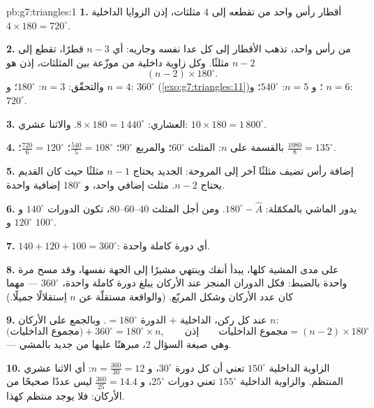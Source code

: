 \begin{solution}{pb:g7:triangles:1}
\textbf{1.} أقطار رأس واحد من  تقطعه
إلى $4$ مثلثات، إذن  الزوايا الداخلية
$4 \times 180 = 720^\circ$.

\textbf{2.} من رأس واحد، تذهب الأقطار إلى كل  عدا
نفسه وجاريه: أي $n - 3$ قطرًا، تقطع
 إلى $n - 2$ مثلثًا. وكل زاوية داخلية من
 موزّعة بين المثلثات، إذن  هو
\[
(n - 2) \times 180^\circ .
\]
والتحقّق: $n = 3$: $180^\circ$؛ و $n = 4$: $360^\circ$
(\cref{exo:g7:triangles:11})؛ و $n = 5$: $540^\circ$؛ و $n = 6$:
$720^\circ$.

\textbf{3.} العشاري: $8 \times 180 = 1\,440^\circ$. والاثنا عشري:
$10 \times 180 = 1\,800^\circ$.

\textbf{4.} بالقسمة على $n$: المثلث $60^\circ$؛ والمربع
$90^\circ$؛  $\frac{540}{5} = 108^\circ$؛ 
$\frac{720}{6} = 120^\circ$؛  $\frac{1080}{8} =
135^\circ$.

\textbf{5.} إضافة رأس تضيف مثلثًا آخر إلى المروحة:
 الجديد يحتاج $n - 1$ مثلثًا حيث كان القديم يحتاج
$n - 2$. مثلث إضافي واحد، و $180^\circ$ إضافية واحدة.

\textbf{6.} يدور الماشي بالمكمّلة:
$180^\circ - \widehat A$. ومن أجل المثلث $40$--$60$--$80$، تكون
الدورات $140^\circ$ و $120^\circ$ و $100^\circ$.

\textbf{7.} $140 + 120 + 100 = 360^\circ$: أي دورة كاملة واحدة.

\textbf{8.} على مدى المشية كلها، يبدأ أنفك وينتهي
مشيرًا إلى الجهة نفسها، وقد مسح مرة واحدة بالضبط: فكل
الدوران المنجز عند الأركان يبلغ دورة كاملة واحدة،
$360^\circ$ --- مهما كان عدد الأركان وشكل
المربّع. (والواقعة مستقلّة عن $n$ اِستقلالًا جميلًا.)

\textbf{9.} عند كل ركن، الداخلية $+$ الدورة $= 180^\circ$.
وبالجمع على الأركان $n$:
\[
\text{(مجموع الداخليات)} + 360^\circ = 180^\circ \times n,
\qquad\text{إذن}\qquad
\text{مجموع الداخليات} = (n - 2) \times 180^\circ
\]
--- وهي صيغة السؤال 2، مبرهنًا عليها من جديد بالمشي.

\textbf{10.} الزاوية الداخلية $150^\circ$ تعني أن كل دورة
$30^\circ$، و $n = \frac{360}{30} = 12$: أي الاثنا عشري المنتظم.
والزاوية الداخلية $155^\circ$ تعني دورات $25^\circ$، و
$\frac{360}{25} = 14.4$ ليس عددًا صحيحًا من الأركان: فلا يوجد
 منتظم كهذا.


\end{solution}
